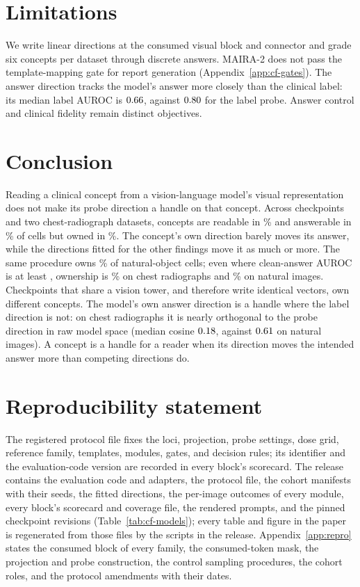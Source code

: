 \documentclass{article}
\begin{document}
\section{Limitations}
\label{sec:limitations}

We write linear directions at the consumed visual block and connector and grade six concepts per dataset through discrete answers. MAIRA-2 does not pass the template-mapping gate for report generation (Appendix~\ref{app:cf-gates}). The answer direction tracks the model's answer more closely than the clinical label: its median label AUROC is $0.66$, against $0.80$ for the label probe. Answer control and clinical fidelity remain distinct objectives.
\newpage
\section{Conclusion}
\label{sec:conclusion}

Reading a clinical concept from a vision-language model's visual representation does not make its probe direction a handle on that concept. Across \cfCheckpoints{} checkpoints and two chest-radiograph datasets, concepts are readable in \cfChestReadablePct\% and answerable in \cfChestAnswerablePct\% of cells but owned in \cfChestOwnedPct\%. The concept's own direction barely moves its answer, while the directions fitted for the other findings move it as much or more. The same procedure owns \cfCocoOwnedPct\% of natural-object cells; even where clean-answer AUROC is at least \cfStratTopEdge{}, ownership is \cfStratChestTopPct\% on chest radiographs and \cfStratNatTopPct\% on natural images. Checkpoints that share a vision tower, and therefore write identical vectors, own different concepts. The model's own answer direction is a handle where the label direction is not: on chest radiographs it is nearly orthogonal to the probe direction in raw model space (median cosine $0.18$, against $0.61$ on natural images). A concept is a handle for a reader when its direction moves the intended answer more than competing directions do.
\section*{Reproducibility statement}
The registered protocol file fixes the loci, projection, probe settings, dose grid, reference family, templates, modules, gates, and decision rules; its identifier and the evaluation-code version are recorded in every block's scorecard. The release contains the evaluation code and adapters, the protocol file, the cohort manifests with their seeds, the fitted directions, the per-image outcomes of every module, every block's scorecard and coverage file, the rendered prompts, and the pinned checkpoint revisions (Table~\ref{tab:cf-models}); every table and figure in the paper is regenerated from those files by the scripts in the release. Appendix~\ref{app:repro} states the consumed block of every family, the consumed-token mask, the projection and probe construction, the control sampling procedures, the cohort roles, and the protocol amendments with their dates.
\end{document}
